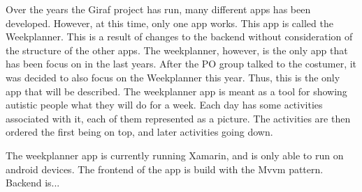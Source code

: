 Over the years the Giraf project has run, many different apps has been developed. However, at this time, only one app works. This app is called the Weekplanner. This is a result of changes to the backend without consideration of the structure of the other apps\cite{AppsStatus2019}. 
The weekplanner, however, is the only app that has been focus on in the last years. After the \gls{PO} group talked to the costumer, it was decided to also focus on the Weekplanner this year. Thus, this is the only app that will be described. 
The weekplanner app is meant as a tool for showing autistic people what they will do for a week. Each day has some activities associated with it, each of them represented as a picture. The activities are then ordered the first being on top, and later activities going down. 


The weekplanner app is currently running Xamarin, and is only able to run on android devices. The frontend of the app is build with the \gls{Mvvm} pattern. 
Backend is... %
